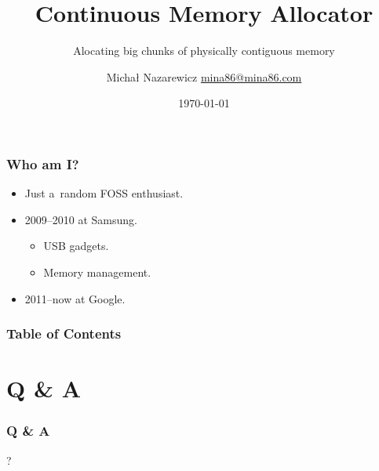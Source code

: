 \documentclass{beamer}
\title{Continuous Memory Allocator}
\subtitle{Alocating big chunks of physically contiguous memory}
\author[Michał Nazarewicz]{%
  \texorpdfstring{Michał Nazarewicz\vskip 8pt%
    \scriptsize\href{mailto:mina86@mina86.com}{mina86@mina86.com}}{%
    Michał Nazarewicz}}
\institute{\Google}
\date{\today}
\begin{document}
\begin{frame}
  \titlepage
\end{frame}

\begin{frame}
  \frametitle{Who am I?}

  \begin{itemize}
  \item Just a~random FOSS enthusiast.
  \item 2009--2010 at Samsung.
    \begin{itemize}
    \item USB gadgets.
    \item Memory management.
    \end{itemize}
  \item 2011--now at Google.
  \end{itemize}
\end{frame}

\begin{frame}
  \frametitle{Table of Contents}
  \tableofcontents[hideallsubsections]
\end{frame}








\appendix

\section*{Q \& A}
\begin{frame}
  \frametitle{Q \& A}

  \begin{center}
  {\Huge ?}
  \end{center}
\end{frame}
\end{document}
